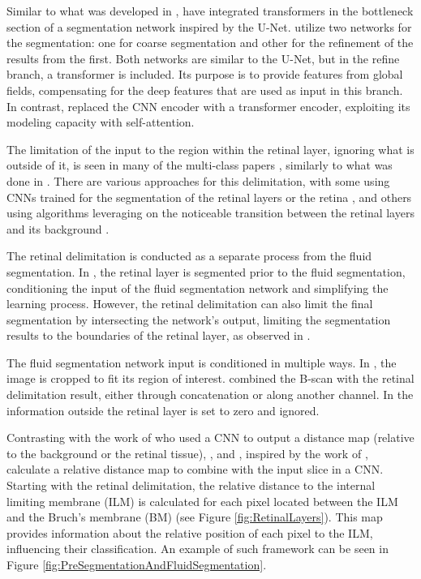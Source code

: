 \par
Similar to what was developed in \textcite{Quek2022}, \textcite{Liu2024} have integrated transformers in the bottleneck section of a segmentation network inspired by the U-Net. \textcite{Liu2024} utilize two networks for the segmentation: one for coarse segmentation and other for the refinement of the results from the first. Both networks are similar to the U-Net, but in the refine branch, a transformer is included. Its purpose is to provide features from global fields, compensating for the deep features that are used as input in this branch. In contrast, \textcite{Zhang2023} replaced the CNN encoder with a transformer encoder, exploiting its modeling capacity with self-attention.
\par
The limitation of the input to the region within the retinal layer, ignoring what is outside of it, is seen in many of the multi-class papers \parencite{Hassan2021b, Hassan2021a, Lu2019, Mantel2021, Rahil2023, Tang2022, Xing2022}, similarly to what was done in \textcite{Pawan2021}. There are various approaches for this delimitation, with some using CNNs trained for the segmentation of the retinal layers or the retina \parencite{Mantel2021, Tang2022}, and others using algorithms leveraging on the noticeable transition between the retinal layers and its background \parencite{Hassan2021b, Hassan2021a, Lu2019, Rahil2023, Xing2022, Pawan2021}. 
\par
The retinal delimitation is conducted as a separate process from the fluid segmentation. In \parencite{Tang2022, Hassan2021b, Hassan2021a, Lu2019, Rahil2023, Xing2022}, the retinal layer is segmented prior to the fluid segmentation, conditioning the input of the fluid segmentation network and simplifying the learning process. However, the retinal delimitation can also limit the final segmentation by intersecting the network's output, limiting the segmentation results to the boundaries of the retinal layer, as observed in \textcite{Mantel2021}.
\par
The fluid segmentation network input is conditioned in multiple ways. In \textcite{Xing2022}, the image is cropped to fit its region of interest. \parencite{Rahil2023, Tang2022, Lu2019} combined the B-scan with the retinal delimitation result, either through concatenation or along another channel. In \parencite{Hassan2021b, Hassan2021a, Pawan2021} the information outside the retinal layer is set to zero and ignored. 
\par
Contrasting with the work of \textcite{Liu2021} who used a CNN to output a distance map (relative to the background or the retinal tissue), \textcite{Tang2022}, and \textcite{Rahil2023}, inspired by the work of \textcite{Lu2019}, calculate a relative distance map to combine with the input slice in a CNN. Starting with the retinal delimitation, the relative distance to the internal limiting membrane (ILM) is calculated for each pixel located between the ILM and the Bruch's membrane (BM) (see Figure \ref{fig:RetinalLayers}). This map provides information about the relative position of each pixel to the ILM, influencing their classification. An example of such framework can be seen in Figure \ref{fig:PreSegmentationAndFluidSegmentation}.
